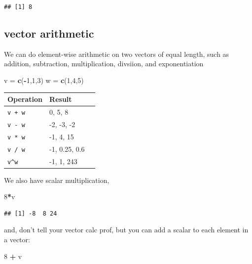 \documentclass[
]{book}
\newenvironment{Shaded}{\begin{snugshade}}{\end{snugshade}}
\newcommand{\DecValTok}[1]{\textcolor[rgb]{0.00,0.00,0.81}{#1}}
\newcommand{\FunctionTok}[1]{\textcolor[rgb]{0.13,0.29,0.53}{\textbf{#1}}}
\newcommand{\NormalTok}[1]{#1}
\newcommand{\OtherTok}[1]{\textcolor[rgb]{0.56,0.35,0.01}{#1}}
\newcommand{\SpecialCharTok}[1]{\textcolor[rgb]{0.81,0.36,0.00}{\textbf{#1}}}
\theoremstyle{definition}
\theoremstyle{definition}
\theoremstyle{definition}
\theoremstyle{definition}
\theoremstyle{remark}
\begin{document}
\begin{verbatim}
## [1] 8
\end{verbatim}

\subsection*{vector arithmetic}\label{vector-arithmetic}

We can do element-wise arithmetic on two vectors of equal length, such as addition, subtraction, multiplication, divsiion, and exponentiation

\begin{Shaded}
\begin{Highlighting}[]
\NormalTok{v }\OtherTok{=} \FunctionTok{c}\NormalTok{(}\SpecialCharTok{{-}}\DecValTok{1}\NormalTok{,}\DecValTok{1}\NormalTok{,}\DecValTok{3}\NormalTok{)}
\NormalTok{w }\OtherTok{=} \FunctionTok{c}\NormalTok{(}\DecValTok{1}\NormalTok{,}\DecValTok{4}\NormalTok{,}\DecValTok{5}\NormalTok{)}
\end{Highlighting}
\end{Shaded}

\begin{longtable}[]{@{}lll@{}}
\toprule\noalign{}
Operation & Result & \\
\midrule\noalign{}
\endhead
\bottomrule\noalign{}
\endlastfoot
\texttt{v\ +\ w} & 0, 5, 8 & \\
\texttt{v\ -\ w} & -2, -3, -2 & \\
\texttt{v\ *\ w} & -1, 4, 15 & \\
\texttt{v\ /\ w} & -1, 0.25, 0.6 & \\
\texttt{v\^{}w} & -1, 1, 243 & \\
\end{longtable}

We also have scalar multiplication,

\begin{Shaded}
\begin{Highlighting}[]
\DecValTok{8}\SpecialCharTok{*}\NormalTok{v}
\end{Highlighting}
\end{Shaded}

\begin{verbatim}
## [1] -8  8 24
\end{verbatim}

and, don't tell your vector calc prof, but you can add a scalar to each element in a vector:

\begin{Shaded}
\begin{Highlighting}[]
\DecValTok{8} \SpecialCharTok{+}\NormalTok{ v}
\end{Highlighting}
\end{Shaded}
\end{document}
